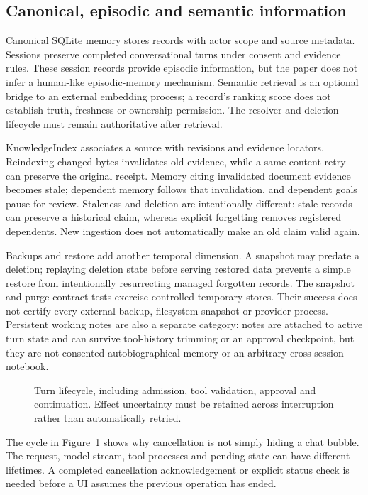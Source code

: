 \documentclass[11pt,a4paper]{article}
\begin{document}
\subsection{Canonical, episodic and semantic information}
Canonical SQLite memory stores records with actor scope and source metadata. Sessions preserve completed conversational turns under consent and evidence rules. These session records provide episodic information, but the paper does not infer a human-like episodic-memory mechanism. Semantic retrieval is an optional bridge to an external embedding process; a record's ranking score does not establish truth, freshness or ownership permission. The resolver and deletion lifecycle must remain authoritative after retrieval.

KnowledgeIndex associates a source with revisions and evidence locators. Reindexing changed bytes invalidates old evidence, while a same-content retry can preserve the original receipt. Memory citing invalidated document evidence becomes stale; dependent memory follows that invalidation, and dependent goals pause for review. Staleness and deletion are intentionally different: stale records can preserve a historical claim, whereas explicit forgetting removes registered dependents. New ingestion does not automatically make an old claim valid again.

Backups and restore add another temporal dimension. A snapshot may predate a deletion; replaying deletion state before serving restored data prevents a simple restore from intentionally resurrecting managed forgotten records. The snapshot and purge contract tests exercise controlled temporary stores. Their success does not certify every external backup, filesystem snapshot or provider process. Persistent working notes are also a separate category: notes are attached to active turn state and can survive tool-history trimming or an approval checkpoint, but they are not consented autobiographical memory or an arbitrary cross-session notebook.

\begin{figure}[tbp]\centering
\caption{Turn lifecycle, including admission, tool validation, approval and continuation. Effect uncertainty must be retained across interruption rather than automatically retried.}\label{fig:lifecycle}\end{figure}
The cycle in Figure~\ref{fig:lifecycle} shows why cancellation is not simply hiding a chat bubble. The request, model stream, tool processes and pending state can have different lifetimes. A completed cancellation acknowledgement or explicit status check is needed before a UI assumes the previous operation has ended.
\end{document}
